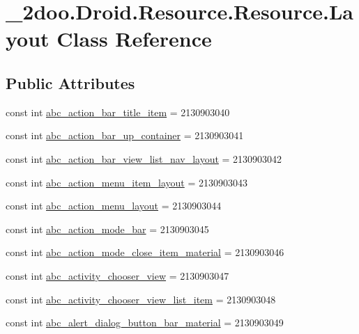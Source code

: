 \hypertarget{class__2doo_1_1_droid_1_1_resource_1_1_layout}{
\section{\_\-2doo.Droid.Resource.Resource.Layout Class Reference}
\label{class__2doo_1_1_droid_1_1_resource_1_1_layout}
}
\subsection*{Public Attributes}
\begin{CompactItemize}
\item 
const int \hyperlink{class__2doo_1_1_droid_1_1_resource_1_1_layout_d4d0e24ee5e0e534a01020ef4ede81f9}{abc\_\-action\_\-bar\_\-title\_\-item} = 2130903040
\item 
const int \hyperlink{class__2doo_1_1_droid_1_1_resource_1_1_layout_6221835d62f368db46695d8b7486fd3e}{abc\_\-action\_\-bar\_\-up\_\-container} = 2130903041
\item 
const int \hyperlink{class__2doo_1_1_droid_1_1_resource_1_1_layout_de1f7b3ed4d2aeac6f9d7d3a980fa871}{abc\_\-action\_\-bar\_\-view\_\-list\_\-nav\_\-layout} = 2130903042
\item 
const int \hyperlink{class__2doo_1_1_droid_1_1_resource_1_1_layout_76d78b9ad25530284c9b020394c508c8}{abc\_\-action\_\-menu\_\-item\_\-layout} = 2130903043
\item 
const int \hyperlink{class__2doo_1_1_droid_1_1_resource_1_1_layout_87969ff39c7133ff70eb39a532197205}{abc\_\-action\_\-menu\_\-layout} = 2130903044
\item 
const int \hyperlink{class__2doo_1_1_droid_1_1_resource_1_1_layout_bb56d3d2a259572cc8a38b45ae5d2cf7}{abc\_\-action\_\-mode\_\-bar} = 2130903045
\item 
const int \hyperlink{class__2doo_1_1_droid_1_1_resource_1_1_layout_b06a24a7363587c7b93d5d1bf95a96ba}{abc\_\-action\_\-mode\_\-close\_\-item\_\-material} = 2130903046
\item 
const int \hyperlink{class__2doo_1_1_droid_1_1_resource_1_1_layout_25a7ddfac61a416b3e7c7c255878b6b1}{abc\_\-activity\_\-chooser\_\-view} = 2130903047
\item 
const int \hyperlink{class__2doo_1_1_droid_1_1_resource_1_1_layout_8e026e9a282bcaa1d95a8a43817c4293}{abc\_\-activity\_\-chooser\_\-view\_\-list\_\-item} = 2130903048
\item 
const int \hyperlink{class__2doo_1_1_droid_1_1_resource_1_1_layout_4de21478e332bff58bcf0e418476728a}{abc\_\-alert\_\-dialog\_\-button\_\-bar\_\-material} = 2130903049

\end{CompactItemize}
